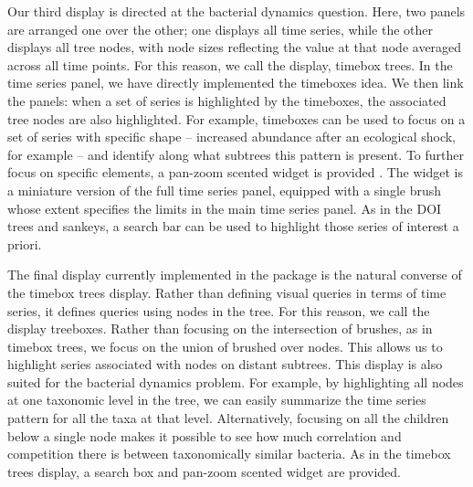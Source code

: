 \documentclass[12pt]{article}
\begin{document}
Our third display is directed at the bacterial dynamics question. Here, two
panels are arranged one over the other; one displays all time series, while the
other displays all tree nodes, with node sizes reflecting the value at that node
averaged across all time points. For this reason, we call the display, timebox
trees. In the time series panel, we have directly implemented the timeboxes
idea. We then link the panels: when a set of series is highlighted by the
timeboxes, the associated tree nodes are also highlighted. For example,
timeboxes can be used to focus on a set of series with specific shape --
increased abundance after an ecological shock, for example -- and identify along
what subtrees this pattern is present. To further focus on specific elements, a
pan-zoom scented widget is provided \citep{willett2007scented}. The widget is a
miniature version of the full time series panel, equipped with a single brush
whose extent specifies the limits in the main time series panel. As in the DOI
trees and sankeys, a search bar can be used to highlight those series of
interest a priori.

The final display currently implemented in the package is the natural converse
of the timebox trees display. Rather than defining visual queries in terms of
time series, it defines queries using nodes in the tree. For this reason, we
call the display treeboxes. Rather than focusing on the intersection of brushes,
as in timebox trees, we focus on the union of brushed over nodes. This allows us
to highlight series associated with nodes on distant subtrees. This display is
also suited for the bacterial dynamics problem. For example, by highlighting all
nodes at one taxonomic level in the tree, we can easily summarize the time
series pattern for all the taxa at that level. Alternatively, focusing on all
the children below a single node makes it possible to see how much correlation
and competition there is between taxonomically similar bacteria. As in the
timebox trees display, a search box and pan-zoom scented widget are provided.
\end{document}
